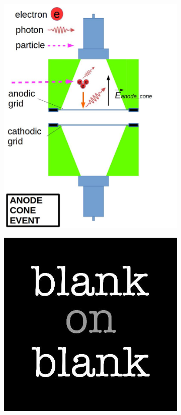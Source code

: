 \begin{figure}[!p]
	\centering
	\begin{subfigure}[b]{\halfwidth}
		\centering
		\includegraphics[width=\figurewidth,clip,trim={0 0 0 0},angle=0,origin=c]{Figures/GasTest/WeiDrawEvent/AboveAno.jpg}
		\caption{}
		\label{fig:AboveAnode a}
	\end{subfigure}
	\begin{subfigure}[b]{\halfwidth}
		\centering
		\includegraphics[width=\figurewidth,clip,trim={0 0 0 0}]{blank.jpg}

\end{subfigure}
\end{figure}
